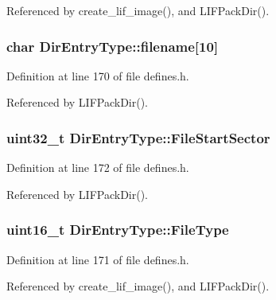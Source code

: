 Referenced by create\+\_\+lif\+\_\+image(), and L\+I\+F\+Pack\+Dir().

\subsubsection[{\texorpdfstring{filename}{filename}}]{\setlength{\rightskip}{0pt plus 5cm}char Dir\+Entry\+Type\+::filename\mbox{[}10\mbox{]}}\hypertarget{structDirEntryType_aa60fae0a6b7ba9c966cbcf46e555f396}{}\label{structDirEntryType_aa60fae0a6b7ba9c966cbcf46e555f396}


Definition at line 170 of file defines.\+h.



Referenced by L\+I\+F\+Pack\+Dir().

\subsubsection[{\texorpdfstring{File\+Start\+Sector}{FileStartSector}}]{\setlength{\rightskip}{0pt plus 5cm}uint32\+\_\+t Dir\+Entry\+Type\+::\+File\+Start\+Sector}\hypertarget{structDirEntryType_a062849a9cc935042c7a3a28ed90ab6a1}{}\label{structDirEntryType_a062849a9cc935042c7a3a28ed90ab6a1}


Definition at line 172 of file defines.\+h.



Referenced by L\+I\+F\+Pack\+Dir().

\subsubsection[{\texorpdfstring{File\+Type}{FileType}}]{\setlength{\rightskip}{0pt plus 5cm}uint16\+\_\+t Dir\+Entry\+Type\+::\+File\+Type}\hypertarget{structDirEntryType_a97b6ddc8d198c32bf4a29c4784ab7188}{}\label{structDirEntryType_a97b6ddc8d198c32bf4a29c4784ab7188}


Definition at line 171 of file defines.\+h.



Referenced by create\+\_\+lif\+\_\+image(), and L\+I\+F\+Pack\+Dir().

